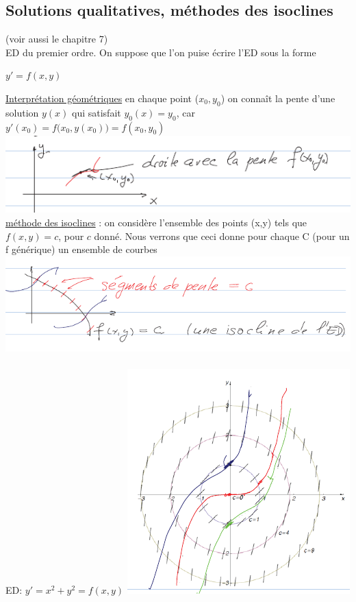 \documentclass[12pt,a4paper]{article}
\begin{document}
\subsection{Solutions qualitatives, méthodes des isoclines} (voir aussi le chapitre 7)\\
ED du premier ordre. On suppose que l'on puise écrire l'ED sous la forme 
\begin{boite}[0.17]
$y' = f(x,y)$
\end{boite}
\underline{Interprétation géométriques} en chaque point ($x_0,y_0$) on connaît la pente d'une solution $y(x)$ qui satisfait $y_0(x) = y_0$, car $y'(x_0) = f\big(x_0,y(x_0)\big) = f(x_0,y_0)$
\includegraphics[scale=0.5]{images/isocline1}\\
\underline{méthode des isoclines} : on considère l'ensemble des points (x,y) tels que $f(x,y) = c$, pour $c$ donné. Nous verrons que ceci donne pour chaque C (pour un f générique) un ensemble de courbes\\
\includegraphics[scale=0.5]{images/isocline2}\\
\\
ED: $y' = x^2+y^2 = f(x,y)$
\includegraphics[scale=0.4]{images/isocline3}
\end{document}
